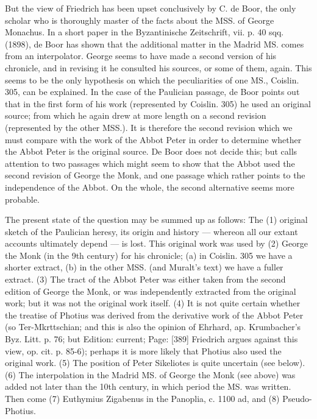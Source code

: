 But the view of Friedrich has been upset conclusively by C. de Boor, the only scholar who is thoroughly master of the facts about the MSS. of George Monachus. In a short paper in the Byzantinische Zeitschrift, vii. p. 40 sqq. (1898), de Boor has shown that the additional matter in the Madrid MS. comes from an interpolator. George seems to have made a second version of his chronicle, and in revising it he consulted his sources, or some of them, again. This seems to be the only hypothesis on which the peculiarities of one MS., Coislin. 305, can be explained. In the case of the Paulician passage, de Boor points out that in the first form of his work (represented by Coislin. 305) he used an original source; from which he again drew at more length on a second revision (represented by the other MSS.). It is therefore the second revision which we must compare with the work of the Abbot Peter in order to determine whether the Abbot Peter is the original source. De Boor does not decide this; but calls attention to two passages which might seem to show that the Abbot used the second revision of George the Monk, and one passage which rather points to the independence of the Abbot. On the whole, the second alternative seems more probable.

The present state of the question may be summed up as follows: The (1) original sketch of the Paulician heresy, its origin and history \texthebrew{—} whereon all our extant accounts ultimately depend \texthebrew{—} is lost. This original work was used by (2) George the Monk (in the 9th century) for his chronicle; (a) in Coislin. 305 we have a shorter extract, (b) in the other MSS. (and Muralt\texthebrew{}’s text) we have a fuller extract. (3) The tract of the Abbot Peter was either taken from the second edition of George the Monk, or was independently extracted from the original work; but it was not the original work itself. (4) It is not quite certain whether the treatise of Photius was derived from the derivative work of the Abbot Peter (so Ter-Mkrttschian; and this is also the opinion of Ehrhard, ap. Krumbacher\texthebrew{}’s Byz. Litt. p. 76; but Edition: current; Page: [389] Friedrich argues against this view, op. cit. p. 85-6); perhaps it is more likely that Photius also used the original work. (5) The position of Peter Sikeliotes is quite uncertain (see below). (6) The interpolation in the Madrid MS. of George the Monk (see above) was added not later than the 10th century, in which period the MS. was written. Then come (7) Euthymius Zigabenus in the Panoplia, c. 1100 ad, and (8) Pseudo-Photius.

